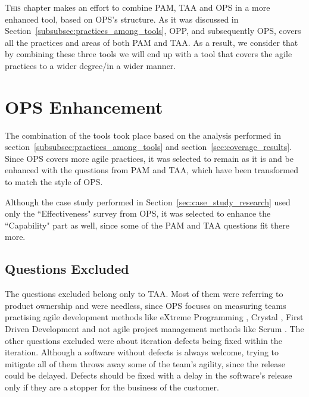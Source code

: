 \lettrine[lines=2, loversize=-0.1, lraise=0.1]{T}{his} chapter makes an effort to combine \ac{PAM}, \ac{TAA} and \ac{OPS} in a more enhanced tool, based on \ac{OPS}'s structure. As it was discussed in Section~\ref{subsubsec:practices_among_tools}, \ac{OPP}, and subsequently \ac{OPS}, covers all the practices and areas of both \ac{PAM} and \ac{TAA}. As a result, we consider that by combining these three tools we will end up with a tool that covers the agile practices to a wider degree/in a wider manner.

\section{\ac{OPS} Enhancement}
The combination of the tools took place based on the analysis performed in section~\ref{subsubsec:practices_among_tools} and section~\ref{sec:coverage_results}. Since \ac{OPS} covers more agile practices, it was selected to remain as it is and be enhanced with the questions from \ac{PAM} and \ac{TAA}, which have been transformed to match the style of \ac{OPS}.

Although the case study performed in Section~\ref{sec:case_study_research} used only the ``Effectiveness" survey from \ac{OPS}, it was selected to enhance the ``Capability" part as well, since some of the \ac{PAM} and \ac{TAA} questions fit there more.

\subsection{Questions Excluded}
The questions excluded belong only to \ac{TAA}. Most of them were referring to product ownership and were needless, since \ac{OPS} focuses on measuring teams practising agile development methods like eXtreme Programming \cite{Beck:2004:EPE:1076267}, Crystal \cite{Cockburn:2004:CCH:1406822}, First Driven Development \cite{Palmer:2001:PGF:600044} and not agile project management methods like Scrum \cite{scrum}. The other questions excluded were about iteration defects being fixed within the iteration. Although a software without defects is always welcome, trying to mitigate all of them throws away some of the team's agility, since the release could be delayed. Defects should be fixed with a delay in the software's release only if they are a stopper for the business of the customer.

